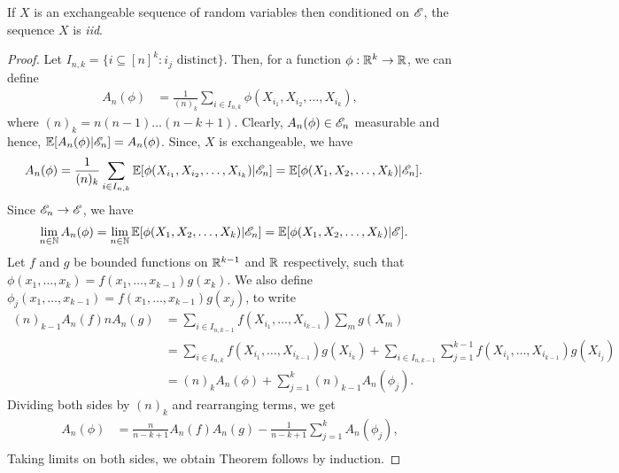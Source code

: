 \documentclass[a4paper,10pt,english]{article}
\begin{document}
\begin{thm} 
If $X$ is an exchangeable sequence of random variables then conditioned on $\mathscr{E}$, the sequence $X$ is \textit{iid}. 
\end{thm}
\begin{proof} Let $I_{n,k} = \{i \subseteq [n]^k: i_j \text{ distinct}\}$. 
Then, for a function $\phi: \mathbb{R}^k \to \mathbb{R}$, we can define
\begin{align*}
A_n(\phi) &= \frac{1}{(n)_k}\sum_{i \in I_{n,k}}\phi(X_{i_1}, X_{i_2}, \ldots, X_{i_k}),
\end{align*}
where $(n)_k = n(n-1)\ldots(n-k+1)$. Clearly, $A_n(\phi) \in \mathscr{E}_n$ measurable and hence,
$\mathbb{E}[A_n(\phi)|\mathscr{E}_n] = A_n(\phi)$. Since, $X$ is exchangeable, we have
\begin{align*}
A_n(\phi) &= \frac{1}{(n)_k}\sum_{i \in I_{n,k}}\mathbb{E}[\phi(X_{i_1}, X_{i_2}, \ldots, X_{i_k})|\mathscr{E}_n] = \mathbb{E}[\phi(X_{1}, X_{2}, \ldots, X_{k})|\mathscr{E}_n].
\end{align*}
Since $\mathscr{E}_n \to \mathscr{E}$, we have 
\begin{align*}
\lim_{n \in \mathbb{N}} A_n(\phi) &= \lim_{n \in \mathbb{N}} \mathbb{E}[\phi(X_{1}, X_{2}, \ldots, X_{k})|\mathscr{E}_n] = \mathbb{E}[\phi(X_{1}, X_{2}, \ldots, X_{k})|\mathscr{E}] .
\end{align*}
Let $f$ and $g$ be bounded functions on $\mathbb{R}^{k-1}$ and $\mathbb{R}$ respectively, such that $\phi(x_1,\ldots,x_k) = f(x_1,\ldots,x_{k-1})g(x_k)$. We also define $\phi_j(x_1,\ldots,x_{k-1}) = f(x_1,\ldots,x_{k-1})g(x_j)$, to write 
\begin{align*}
(n)_{k-1}A_n(f)nA_n(g) &= \sum_{i \in I_{n,k-1}}f(X_{i_1}, \ldots,X_{i_{k-1}})\sum_{m}g(X_{m})\\
&= \sum_{i \in I_{n,k}}f(X_{i_1}, \ldots,X_{i_{k-1}})g(X_{i_k}) + \sum_{i \in I_{n,k-1}}\sum_{j=1}^{k-1}f(X_{i_1},\ldots,X_{i_{k-1}})g(X_{i_j})\\
&= (n)_kA_n(\phi) + \sum_{j=1}^k(n)_{k-1}A_n(\phi_j).
\end{align*}
Dividing both sides by $(n)_k$ and rearranging terms, we get
\begin{align*}
A_n(\phi)& = \frac{n}{n-k+1}A_n(f)A_n(g) - \frac{1}{n-k+1}\sum_{j=1}^kA_n(\phi_j),\\
\end{align*}
Taking limits on both sides, we obtain
Theorem follows by induction.
\end{proof}
\end{document}

